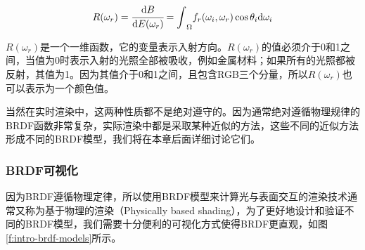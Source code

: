 \begin{equation}
	R(\omega_r)= \cfrac{{\rm d}B}{{\rm d}E(\omega_r)}={\rm \int}_{\Omega}f_r(\omega_i,\omega_r)\cos\theta_i {\rm d}\omega_i
\end{equation}

\noindent $R(\omega_r)$是一个一维函数，它的变量表示入射方向。$R(\omega_r)$的值必须介于0和1之间，当值为0时表示入射的光照全部被吸收，例如金属材料；如果所有的光照都被反射，其值为1。因为其值介于0和1之间，且包含RGB三个分量，所以$R(\omega_r)$也可以表示为一个颜色值。

当然在实时渲染中，这两种性质都不是绝对遵守的。因为通常绝对遵循物理规律的BRDF函数非常复杂，实际渲染中都是采取某种近似的方法，这些不同的近似方法形成不同的BRDF模型，我们将在本章后面详细讨论它们。






\subsubsection{BRDF可视化}
因为BRDF遵循物理定律，所以使用BRDF模型来计算光与表面交互的渲染技术通常又称为基于物理的渲染（Physically based shading），为了更好地设计和验证不同的BRDF模型，我们需要十分便利的可视化方式使得BRDF更直观，如图\ref{f:intro-brdf-models}所示。

